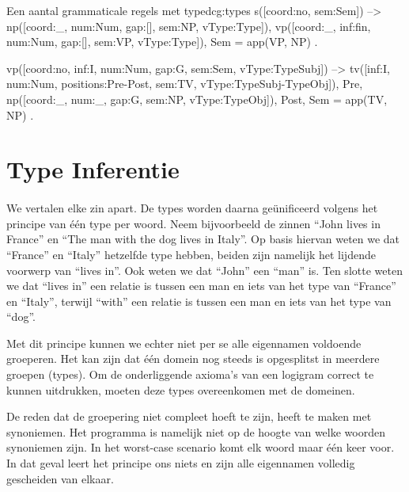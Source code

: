 
\begin{dcg}{Een aantal grammaticale regels met type}{dcg:types}
s([coord:no, sem:Sem]) -->
  np([coord:_, num:Num, gap:[], sem:NP, vType:Type]),
  vp([coord:_, inf:fin, num:Num, gap:[], sem:VP, vType:Type]),
  { Sem = app(VP, NP) }.

vp([coord:no, inf:I, num:Num, gap:G, sem:Sem, vType:TypeSubj]) -->
  tv([inf:I, num:Num, positions:Pre-Post, sem:TV, vType:TypeSubj-TypeObj]),
  Pre,
  np([coord:_, num:_, gap:G, sem:NP, vType:TypeObj]),
  Post,
  { Sem = app(TV, NP) }.
\end{dcg}

\section{Type Inferentie}
\paragraph{} We vertalen elke zin apart. De types worden daarna geünificeerd volgens het principe van één type per woord. Neem bijvoorbeeld de zinnen ``John lives in France'' en ``The man with the dog lives in Italy''. Op basis hiervan weten we dat ``France'' en ``Italy'' hetzelfde type hebben, beiden zijn namelijk het lijdende voorwerp van ``lives in''. Ook weten we dat ``John'' een ``man'' is. Ten slotte weten we dat ``lives in'' een relatie is tussen een man en iets van het type van ``France'' en ``Italy'', terwijl ``with'' een relatie is tussen een man en iets van het type van ``dog''.

Met dit principe kunnen we echter niet per se alle eigennamen voldoende groeperen. Het kan zijn dat één domein nog steeds is opgesplitst in meerdere groepen (types). Om de onderliggende axioma's van een logigram correct te kunnen uitdrukken, moeten deze types overeenkomen met de domeinen.

De reden dat de groepering niet compleet hoeft te zijn, heeft te maken met synoniemen. Het programma is namelijk niet op de hoogte van welke woorden synoniemen zijn. In het worst-case scenario komt elk woord maar één keer voor. In dat geval leert het principe ons niets en zijn alle eigennamen volledig gescheiden van elkaar.

